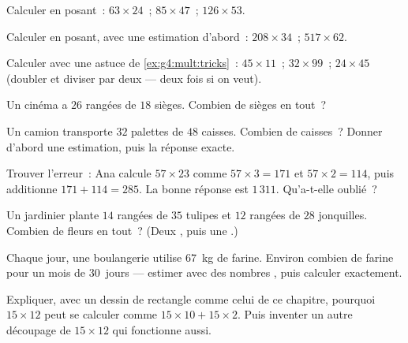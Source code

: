 \begin{exercise}[$\star$]\label{exo:g4:mult:3}
Calculer en posant~: $63 \times 24$~; \quad $85 \times 47$~; \quad
$126 \times 53$.
\end{exercise}

\begin{exercise}[$\star$]\label{exo:g4:mult:4}
Calculer en posant, avec une estimation d'abord~: $208 \times 34$~;
\quad $517 \times 62$.
\end{exercise}

\begin{exercise}[$\star$]\label{exo:g4:mult:5}
Calculer avec une astuce de \cref{ex:g4:mult:tricks}~:
$45 \times 11$~; \quad $32 \times 99$~; \quad $24 \times 45$ (doubler
et diviser par deux --- deux fois si on veut).
\end{exercise}

\begin{exercise}[$\star$]\label{exo:g4:mult:6}
Un cinéma a $26$ rangées de $18$ sièges. Combien de sièges en tout~?
\end{exercise}

\begin{exercise}[$\star$]\label{exo:g4:mult:7}
Un camion transporte $32$ palettes de $48$ caisses. Combien de
caisses~? Donner d'abord une estimation, puis la réponse exacte.
\end{exercise}

\begin{exercise}[$\star$]\label{exo:g4:mult:8}
Trouver l'erreur~: Ana calcule $57 \times 23$ comme
$57 \times 3 = 171$ et $57 \times 2 = 114$, puis additionne
$171 + 114 = 285$. La bonne réponse est $1\,311$. Qu'a-t-elle
oublié~?
\end{exercise}

\begin{exercise}[$\star\star$]\label{exo:g4:mult:9}
Un jardinier plante $14$ rangées de $35$ tulipes et $12$ rangées de
$28$ jonquilles. Combien de fleurs en tout~? (Deux , puis
une .)
\end{exercise}

\begin{exercise}[$\star\star$]\label{exo:g4:mult:10}
Chaque jour, une boulangerie utilise $67$~kg de farine. Environ
combien de farine pour un mois de $30$~jours --- estimer avec des
nombres , puis calculer exactement.
\end{exercise}

\begin{exercise}[$\star\star$]\label{exo:g4:mult:11}
Expliquer, avec un dessin de rectangle comme celui de ce chapitre,
pourquoi $15 \times 12$ peut se calculer comme
$15 \times 10 + 15 \times 2$. Puis inventer un autre découpage de
$15 \times 12$ qui fonctionne aussi.
\end{exercise}

